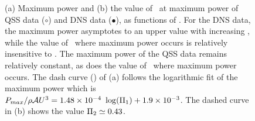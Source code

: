 \begin{figure}
    \caption{(a) Maximum power and (b) the value of \massdamp\ at
      maximum power of QSS data ($\circ$) and DNS data ($\bullet$), as
      functions of \massstiff.  For the DNS data, the maximum power
      asymptotes to an upper value with increasing \massstiff, while
      the value of \massdamp\ where maximum power occurs is relatively
      insensitive to \massstiff. The maximum power of the QSS data
      remains relatively constant, as does the value of \massdamp\
      where maximum power occurs. The dash curve (\protect\dashedrule)
      of (a) follows the logarithmic fit of the maximum power which is
      $P_{max}/\rho \mathcal{A}U^3 =1.48 \times 10^{-4} \
      \log(\Pi_1) + 1.9 \times 10^{-3} $. The dashed curve in (b)
      shows the value $\Pi_2\simeq 0.43$.}

    \label{fig:max_power}
\end{figure}

